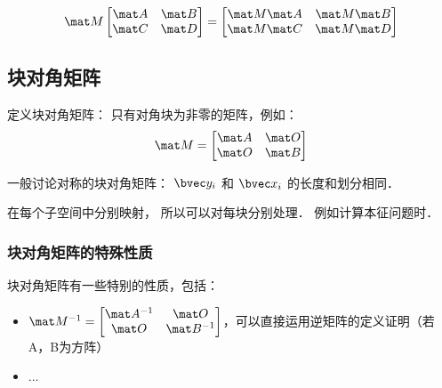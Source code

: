 \begin{equation}
\mat M
\begin{bmatrix}
\mat A & \mat B\\
\mat C & \mat D\\
\end{bmatrix}
=
\begin{bmatrix}
\mat M \mat A & \mat M \mat B\\
\mat M \mat C & \mat M \mat D\\
\end{bmatrix}
\end{equation}


\subsection{块对角矩阵}
定义块对角矩阵： 只有对角块为非零的矩阵，例如：
\begin{equation}
\mat M = 
\begin{bmatrix}
\mat A & \mat O\\
\mat O & \mat B\\
\end{bmatrix}
\end{equation}

一般讨论对称的块对角矩阵： $\bvec y_i$ 和 $\bvec x_i$ 的长度和划分相同．

在每个子空间中分别映射， 所以可以对每块分别处理． 例如计算本征问题时．

\subsubsection{块对角矩阵的特殊性质}
块对角矩阵有一些特别的性质，包括：
\begin{itemize}
\item $\mat M ^ {-1} = 
\begin{bmatrix}
\mat A^{-1} & \mat O\\
\mat O & \mat B^{-1}\\
\end{bmatrix}
$，可以直接运用逆矩阵的定义证明（若A，B为方阵）
\item ...
\end{itemize}
